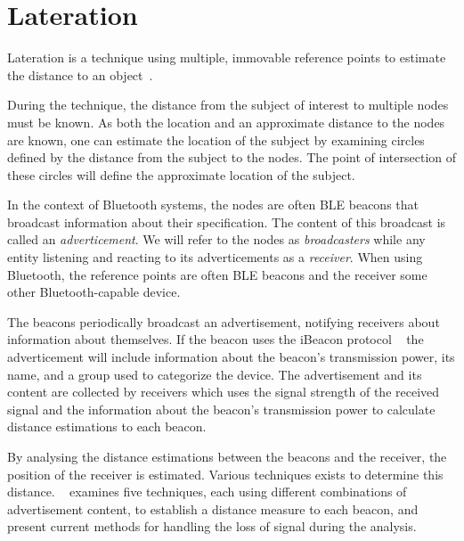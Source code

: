 \section{Lateration}
Lateration is a technique using multiple, immovable reference points to estimate the distance to an object~\cite{presence_ble_review}.

During the technique, the distance from the subject of interest to multiple nodes must be known. 
As both the location and an approximate distance to the nodes are known, one can estimate the location of the subject by examining circles defined by the distance from the subject to the nodes.
The point of intersection of these circles will define the approximate location of the subject.\cite{laterationExplanation}  

In the context of Bluetooth systems, the nodes are often BLE beacons that broadcast information about their specification. 
The content of this broadcast is called an \textit{adverticement}. 
We will refer to the nodes as \textit{broadcasters} while any entity listening and reacting to its adverticements as a \textit{receiver}.
When using Bluetooth, the reference points are often BLE beacons and the receiver some other Bluetooth-capable device.~\cite{apple2023ibeacon} 

The beacons periodically broadcast an advertisement, notifying receivers about information about themselves. 
If the beacon uses the iBeacon protocol ~\cite{apple2023ibeacon} the adverticement will include information about the beacon's transmission power, its name, and a group used to categorize the device.
The advertisement and its content are collected by receivers which uses the signal strength of the received signal and the information about the beacon's transmission power to calculate distance estimations to each beacon. 

By analysing the distance estimations between the beacons and the receiver, the position of the receiver is estimated.
Various techniques exists to determine this distance.
\citeauthor{presence_ble_review}~\cite{presence_ble_review} examines five techniques, each using different combinations of advertisement content, to establish a distance measure to each beacon, and present current methods for handling the loss of signal during the analysis.

